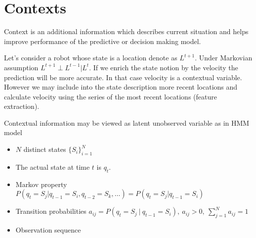 \chapter{Contexts}
\begin{definition}
Context is an additional information which describes current situation and helps improve performance of the predictive or decision making model.
\end{definition}

Let's consider a robot whose state is a location denote as $L^{t+1}$.
Under Markovian assumption $L^{t+1} \perp L^{t-1} | L^{t}$.
If we enrich the state notion by the velocity the prediction will be more accurate.
In that case velocity is a contextual variable.
However we may include into the state description more recent locations and calculate velocity using the series of the most recent locations (feature extraction).

Contextual information may be viewed as latent unobserved variable  as in HMM model~\cite{RabinerHMM}
\begin{itemize}
    \item $N$ distinct states $\{S_i\}_{i=1}^N$
    \item The actual state at time $t$ is $q_t$.
    \item Markov property $P(q_t=S_j|q_{t-1}=S_i, q_{t-2}=S_k, \dots) = P(q_t=S_j|q_{t-1}=S_i)$
    \item Transition probabilities $a_{ij} = P(q_t = S_j \: | \: q_{t-1} = S_i), \: a_{ij}>0, \: \sum_{j=1}^N a_{ij} = 1$
    \item Observation sequence
\end{itemize}
